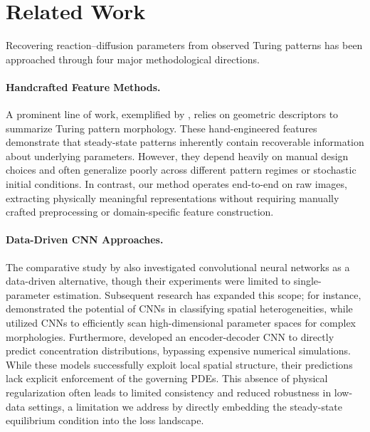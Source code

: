 \documentclass{article} %
\begin{document}
\section{Related Work}

Recovering reaction–diffusion parameters from observed Turing patterns has been approached through four major methodological directions.

\paragraph{Handcrafted Feature Methods.}
A prominent line of work, exemplified by \cite{schnorr2023learning}, relies on geometric descriptors to summarize Turing pattern morphology. These hand-engineered features demonstrate that steady-state patterns inherently contain recoverable information about underlying parameters. However, they depend heavily on manual design choices and often generalize poorly across different pattern regimes or stochastic initial conditions. In contrast, our method operates end-to-end on raw images, extracting physically meaningful representations without requiring manually crafted preprocessing or domain-specific feature construction.

\paragraph{Data-Driven CNN Approaches.}
The comparative study by \cite{schnorr2023learning} also investigated convolutional neural networks as a data-driven alternative, though their experiments were limited to single-parameter estimation. Subsequent research has expanded this scope; for instance, \cite{shin2026exploring} demonstrated the potential of CNNs in classifying spatial heterogeneities, while \cite{scholz2022exploring} utilized CNNs to efficiently scan high-dimensional parameter spaces for complex morphologies. Furthermore, \cite{li2020reaction} developed an encoder-decoder CNN to directly predict concentration distributions, bypassing expensive numerical simulations. While these models successfully exploit local spatial structure, their predictions lack explicit enforcement of the governing PDEs. This absence of physical regularization often leads to limited consistency and reduced robustness in low-data settings, a limitation we address by directly embedding the steady-state equilibrium condition into the loss landscape.
\end{document}
